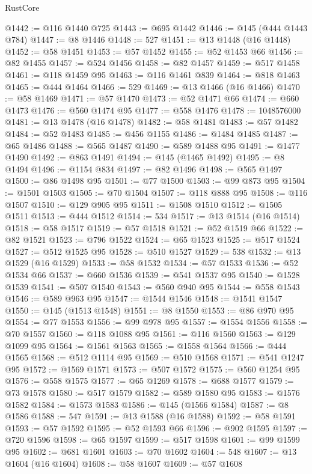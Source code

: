 \begin{lexlean}{RustCore}
\begin{coremodule}
@1442 := @116 @1440 @725
@1443 := @695 @1442
@1446 := @145 (@444 @1443 @784)
@1447 := @8 @1446
@1448 := 527
@1451 := @13 @1448 (@16 @1448)
@1452 := @58 @1451
@1453 := @57 @1452
@1455 := @52 @1453 @66
@1456 := @82 @1455
@1457 := @524 @1456
@1458 := @82 @1457
@1459 := @517 @1458
@1461 := @118 @1459 @95
@1463 := @116 @1461 @839
@1464 := @818 @1463
@1465 := @444 @1464
@1466 := 529
@1469 := @13 @1466 (@16 @1466)
@1470 := @58 @1469
@1471 := @57 @1470
@1473 := @52 @1471 @66
@1474 := @660 @1473
@1476 := @560 @1474 @95
@1477 := @558 @1476
@1478 := 1048576000
@1481 := @13 @1478 (@16 @1478)
@1482 := @58 @1481
@1483 := @57 @1482
@1484 := @52 @1483
@1485 := @456 @1155
@1486 := @1484 @1485
@1487 := @65 @1486
@1488 := @565 @1487
@1490 := @589 @1488 @95
@1491 := @1477 @1490
@1492 := @863 @1491
@1494 := @145 (@1465 @1492)
@1495 := @8 @1494
@1496 := @1154 @834
@1497 := @82 @1496
@1498 := @565 @1497
@1500 := @86 @1498 @95
@1501 := @77 @1500
@1503 := @99 @873 @95
@1504 := @1501 @1503
@1505 := @70 @1504
@1507 := @118 @888 @95
@1508 := @116 @1507
@1510 := @129 @905 @95
@1511 := @1508 @1510
@1512 := @1505 @1511
@1513 := @444 @1512
@1514 := 534
@1517 := @13 @1514 (@16 @1514)
@1518 := @58 @1517
@1519 := @57 @1518
@1521 := @52 @1519 @66
@1522 := @82 @1521
@1523 := @796 @1522
@1524 := @65 @1523
@1525 := @517 @1524
@1527 := @512 @1525 @95
@1528 := @510 @1527
@1529 := 538
@1532 := @13 @1529 (@16 @1529)
@1533 := @58 @1532
@1534 := @57 @1533
@1536 := @52 @1534 @66
@1537 := @660 @1536
@1539 := @541 @1537 @95
@1540 := @1528 @1539
@1541 := @507 @1540
@1543 := @560 @940 @95
@1544 := @558 @1543
@1546 := @589 @963 @95
@1547 := @1544 @1546
@1548 := @1541 @1547
@1550 := @145 (@1513 @1548)
@1551 := @8 @1550
@1553 := @86 @970 @95
@1554 := @77 @1553
@1556 := @99 @978 @95
@1557 := @1554 @1556
@1558 := @70 @1557
@1560 := @118 @1088 @95
@1561 := @116 @1560
@1563 := @129 @1099 @95
@1564 := @1561 @1563
@1565 := @1558 @1564
@1566 := @444 @1565
@1568 := @512 @1114 @95
@1569 := @510 @1568
@1571 := @541 @1247 @95
@1572 := @1569 @1571
@1573 := @507 @1572
@1575 := @560 @1254 @95
@1576 := @558 @1575
@1577 := @65 @1269
@1578 := @688 @1577
@1579 := @73 @1578
@1580 := @517 @1579
@1582 := @589 @1580 @95
@1583 := @1576 @1582
@1584 := @1573 @1583
@1586 := @145 (@1566 @1584)
@1587 := @8 @1586
@1588 := 547
@1591 := @13 @1588 (@16 @1588)
@1592 := @58 @1591
@1593 := @57 @1592
@1595 := @52 @1593 @66
@1596 := @902 @1595
@1597 := @720 @1596
@1598 := @65 @1597
@1599 := @517 @1598
@1601 := @99 @1599 @95
@1602 := @681 @1601
@1603 := @70 @1602
@1604 := 548
@1607 := @13 @1604 (@16 @1604)
@1608 := @58 @1607
@1609 := @57 @1608

\end{coremodule}
\end{lexlean}
